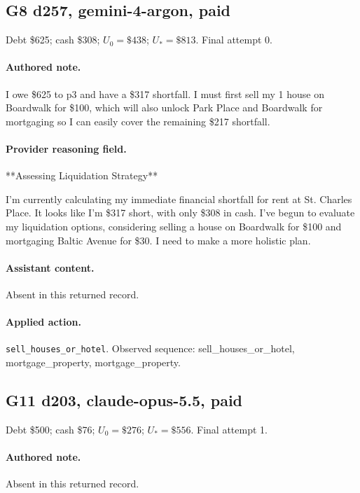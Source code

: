 \subsection*{G8 d257, gemini-4-argon, paid}

\noindent Debt \$625; cash \$308; $U_0=\$438$; $U_*=\$813$. Final attempt 0.\par

\paragraph{Authored note.} I owe \$625 to p3 and have a \$317 shortfall. I must first sell my 1 house on Boardwalk for \$100, which will also unlock Park Place and Boardwalk for mortgaging so I can easily cover the remaining \$217 shortfall.

\paragraph{Provider reasoning field.} **Assessing Liquidation Strategy**

I'm currently calculating my immediate financial shortfall for rent at St. Charles Place. It looks like I'm \$317 short, with only \$308 in cash. I've begun to evaluate my liquidation options, considering selling a house on Boardwalk for \$100 and mortgaging Baltic Avenue for \$30. I need to make a more holistic plan.




\paragraph{Assistant content.} Absent in this returned record.

\paragraph{Applied action.} \texttt{sell\_houses\_or\_hotel}. Observed sequence: sell\_houses\_or\_hotel, mortgage\_property, mortgage\_property.

\subsection*{G11 d203, claude-opus-5.5, paid}

\noindent Debt \$500; cash \$76; $U_0=\$276$; $U_*=\$556$. Final attempt 1.\par

\paragraph{Authored note.} Absent in this returned record.

